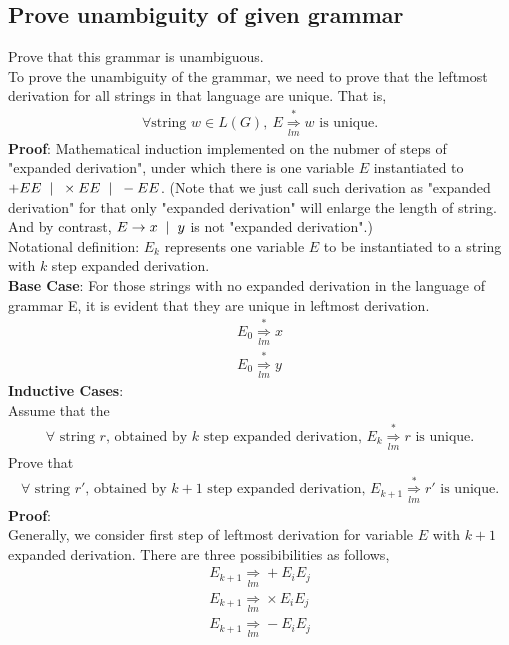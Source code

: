 \documentclass[11pt,a4paper]{article}
\newcommand{\htab}{\hspace*{0.63cm}}
\newcommand{\ba}{\hspace*{0.2cm} | \hspace*{0.2cm}}
\newcommand{\pg}{\\[0.3cm]}
\newcommand{\lmd}{\underset{lm}{\Longrightarrow}}
\newcommand{\mlmd}{\overset{*}{\underset{lm}{\Longrightarrow}}}
\begin{document}
\subsection{Prove unambiguity of given grammar}
\htab Prove that this grammar is unambiguous. \pg
\htab To prove the unambiguity of the grammar, we need to prove that the leftmost derivation for 
all strings in that language are unique. That is,
\begin{align} 
    \forall \text{string } w \in L(G),\ E \mlmd w \text{ is unique.} \label{2:lemma}
    \end{align}
\htab \textbf{Proof}: Mathematical induction implemented on the nubmer of steps of "expanded derivation",
under which there is one variable $E$ instantiated to $+EE \ba \times EE \ba -EE$. (Note that we 
just call such derivation as "expanded derivation" for that only "expanded derivation" will enlarge
the length of string. And by contrast, $E \rightarrow x \ba y$ is not "expanded derivation".) \\
\htab Notational definition: $E_{k}$ represents one variable $E$ to be instantiated to a string 
with $k$ step expanded derivation.  \pg
\htab \textbf{Base Case}: For those strings with no expanded derivation in the language of 
grammar E, it is evident that they are unique in leftmost derivation. 
    \begin{align}
        E_{0} \mlmd x \\
        E_{0} \mlmd y 
        \end{align}
\htab \textbf{Inductive Cases}: \\
\htab Assume that the 
\begin{align} 
    \text{$\forall$ string $r$, obtained by $k$ step expanded derivation, $E_{k} \mlmd r$ is unique.}
    \end{align}
\htab Prove that 
\begin{align}
    \text{$\forall$ string $r'$, obtained by $k+1$ step expanded derivation, $E_{k+1} \mlmd r'$ is unique.}
    \end{align}
\htab \textbf{Proof}:\\
\htab Generally, we consider first step of leftmost derivation for variable $E$ with $k+1$ expanded derivation. There are three possibibilities as follows,
\begin{align} 
    E_{k+1} \lmd + E_{i} E_{j} \\
    E_{k+1} \lmd \times E_{i} E_{j} \\
    E_{k+1} \lmd - E_{i} E_{j} 
    \end{align}
\end{document}
